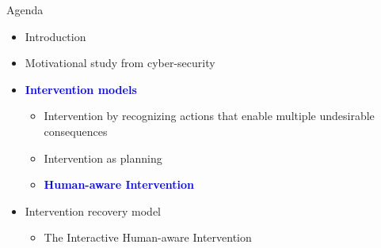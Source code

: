 \begin{frame}{Agenda}
\begin{itemize}
\item Introduction
\item Motivational study from cyber-security
\item \textcolor{blue} {\textbf{Intervention models}}
\begin{itemize}
\item Intervention by recognizing actions that enable multiple undesirable consequences
\item Intervention as planning
\item \textcolor{blue} {\textbf{Human-aware Intervention}}
\end{itemize}
\item Intervention recovery model
\begin{itemize}
\item The Interactive Human-aware Intervention
\end{itemize}
\end{itemize}

\end{frame}
